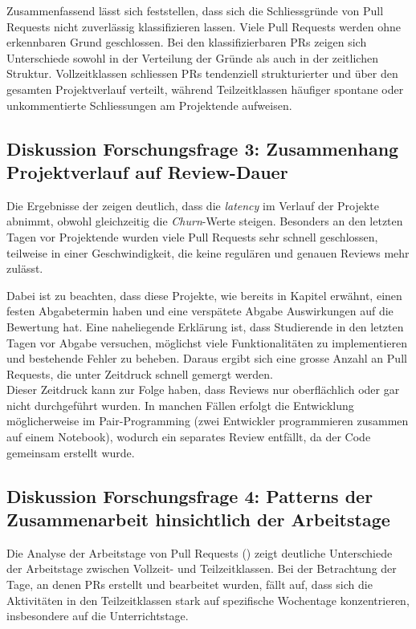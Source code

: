 Zusammenfassend lässt sich feststellen, dass sich die Schliessgründe von Pull Requests nicht zuverlässig klassifizieren lassen. Viele Pull Requests werden ohne erkennbaren Grund geschlossen. Bei den klassifizierbaren PRs zeigen sich Unterschiede sowohl in der Verteilung der Gründe als auch in der zeitlichen Struktur. Vollzeitklassen schliessen PRs tendenziell strukturierter und über den gesamten Projektverlauf verteilt, während Teilzeitklassen häufiger spontane oder unkommentierte Schliessungen am Projektende aufweisen.


\subsection{Diskussion Forschungsfrage 3: Zusammenhang Projektverlauf auf Review-Dauer}
Die Ergebnisse der  zeigen deutlich, dass die \textit{latency} im Verlauf der Projekte abnimmt, obwohl gleichzeitig die \textit{Churn}-Werte steigen. Besonders an den letzten Tagen vor Projektende wurden viele Pull Requests sehr schnell geschlossen, teilweise in einer Geschwindigkeit, die keine regulären und genauen Reviews mehr zulässt. 

Dabei ist zu beachten, dass diese Projekte, wie bereits in Kapitel  erwähnt, einen festen Abgabetermin haben und eine verspätete Abgabe Auswirkungen auf die Bewertung hat. Eine naheliegende Erklärung ist, dass Studierende in den letzten Tagen vor Abgabe versuchen, möglichst viele Funktionalitäten zu implementieren und bestehende Fehler zu beheben. Daraus ergibt sich eine grosse Anzahl an Pull Requests, die unter Zeitdruck schnell gemergt werden. \\
Dieser Zeitdruck kann zur Folge haben, dass Reviews nur oberflächlich oder gar nicht durchgeführt wurden. In manchen Fällen erfolgt die Entwicklung möglicherweise im Pair-Programming (zwei Entwickler programmieren zusammen auf einem Notebook), wodurch ein separates Review entfällt, da der Code gemeinsam erstellt wurde.

\subsection{Diskussion Forschungsfrage 4: Patterns der Zusammenarbeit hinsichtlich der Arbeitstage}
Die Analyse der Arbeitstage von Pull Requests () zeigt deutliche Unterschiede der Arbeitstage zwischen Vollzeit- und Teilzeitklassen. Bei der Betrachtung der Tage, an denen PRs erstellt und bearbeitet wurden, fällt auf, dass sich die Aktivitäten in den Teilzeitklassen stark auf spezifische Wochentage konzentrieren, insbesondere auf die Unterrichtstage. 

